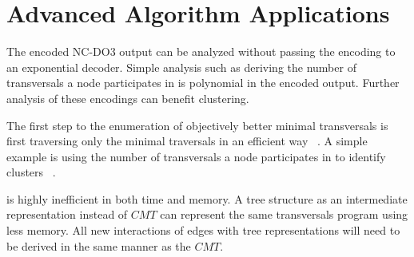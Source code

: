 \section{Advanced Algorithm Applications}

The encoded NC-DO3 output can be analyzed without passing the encoding to an exponential decoder. Simple analysis such as deriving the number of transversals a node participates in is polynomial in the encoded output. Further analysis of these encodings can benefit clustering. 


The first step to the enumeration of objectively better minimal transversals is first traversing only the minimal traversals in an efficient way~ \cite{boros2003efficient}. A simple example is using the number of transversals a node participates in to identify clusters~ \cite{bailey2003fast}. 

 is highly inefficient in both time and memory. A tree structure as an intermediate representation instead of $CMT$ can represent the same transversals program using less memory. All new interactions of edges with tree representations will need to be derived in the same manner as the $CMT$. 